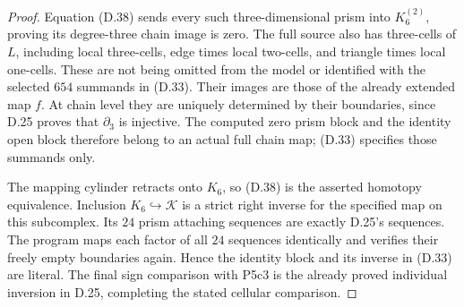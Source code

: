 \begin{proof}
Equation (D.38) sends every such three-dimensional
prism into $K_6^{(2)}$, proving its degree-three
chain image is zero.  The full source also has
three-cells of $L$, including local three-cells,
edge times local two-cells, and triangle times
local one-cells.  These are not being omitted
from the model or identified with the selected
$654$ summands in (D.33).  Their images are those
of the already extended map $f$.  At chain level
they are uniquely determined by their boundaries,
since D.25 proves that $\partial_3$ is injective.
The computed zero prism block and the identity
open block therefore belong to an actual full
chain map; (D.33) specifies those summands only.

The mapping cylinder retracts onto $K_6$, so
(D.38) is the asserted homotopy equivalence.  Inclusion
$K_6\hookrightarrow\mathcal K$ is a strict right
inverse for the specified map on this subcomplex.
Its $24$ prism attaching sequences are exactly
D.25's sequences.  The program maps each factor
of all $24$ sequences identically and verifies
their freely empty boundaries again.  Hence the
identity block and its inverse in (D.33) are
literal.  The final sign comparison with P5c3
is the already proved individual inversion in
D.25, completing the stated cellular comparison.
\end{proof}
